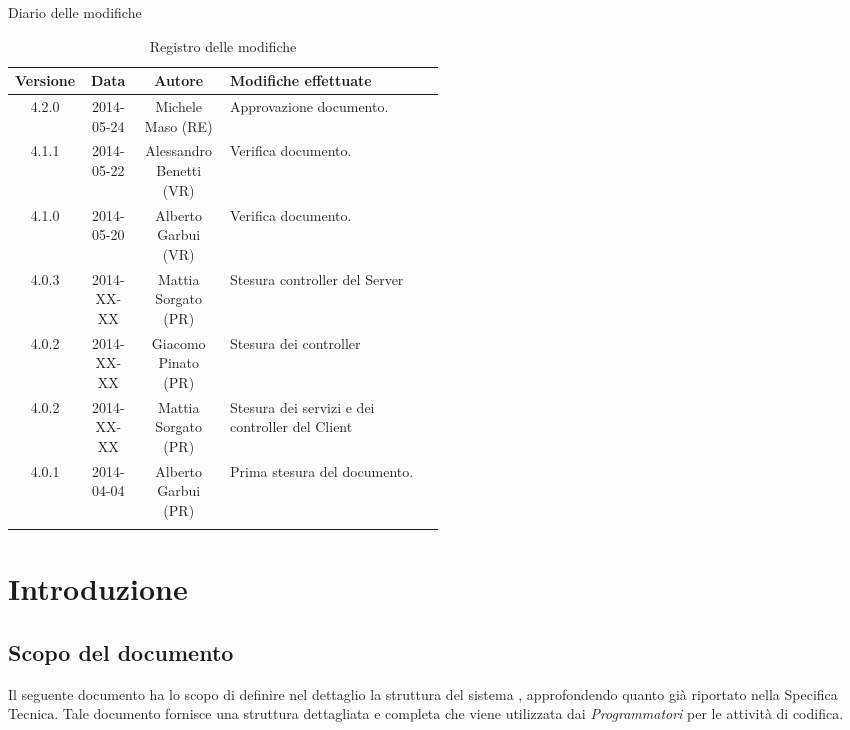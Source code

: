 
\newpage
Diario delle modifiche
\begin{center}
\begin{longtable}{|c|c|c|p{0.5\linewidth}|}
\toprule
\textbf{Versione} & \textbf{Data} & \textbf{Autore} & \textbf{Modifiche effettuate}\\

\midrule
4.2.0 & 2014-05-24 & Michele Maso (RE) & Approvazione documento.\\
\midrule
4.1.1 & 2014-05-22 & Alessandro Benetti (VR) & Verifica documento.\\
\midrule
4.1.0 & 2014-05-20 & Alberto Garbui (VR) & Verifica documento.\\
\midrule
4.0.3 & 2014-XX-XX & Mattia Sorgato (PR) & Stesura controller del Server\\
\midrule
4.0.2 & 2014-XX-XX & Giacomo Pinato (PR) & Stesura dei controller\\
\midrule
4.0.2 & 2014-XX-XX & Mattia Sorgato (PR) & Stesura dei servizi e dei controller del Client\\
\midrule
4.0.1 & 2014-04-04 & Alberto Garbui (PR) & Prima stesura del documento.\\

\bottomrule
\caption{Registro delle modifiche}
\label{tab:changelog}

\end{longtable}
\end{center}

\newpage
\tableofcontents

\newpage
\listoffigures %

\newpage
\section{Introduzione}
\subsection{Scopo del documento}
Il seguente documento ha lo scopo di definire nel dettaglio la struttura del sistema , approfondendo quanto già riportato 
nella Specifica Tecnica. Tale documento fornisce una struttura dettagliata e completa che viene utilizzata dai \emph{Programmatori} per le 
attività di codifica.


